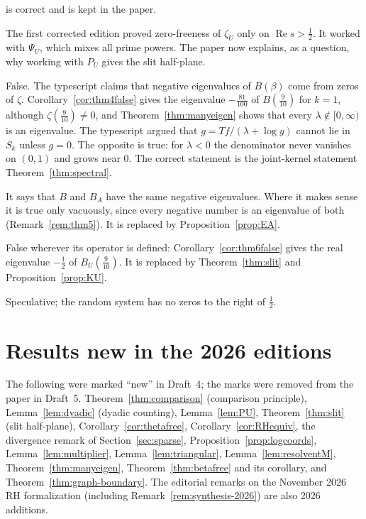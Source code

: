\documentclass[12pt,letterpaper]{article}
\begin{document}
\begin{description}
  is correct and is kept in the paper.
\item[First corrected edition and the slit plane.]  The first corrected
  edition proved zero-freeness of $\zeta_U$ only on $\operatorname{Re} s>\frac12$.  It
  worked with $\Psi_U$, which mixes all prime powers.  The paper now
  explains, as a question, why working with $P_U$ gives the slit
  half-plane.
\item[Theorem 4(a).]  False.  The typescript claims that negative
  eigenvalues of $B(\beta)$ come from zeros of $\zeta$.
  Corollary~\ref{cor:thm4false} gives the eigenvalue $-\frac{81}{100}$ of
  $B(\frac9{10})$ for $k=1$, although $\zeta(\frac9{10})\ne0$, and
  Theorem~\ref{thm:manyeigen} shows that every
  $\lambda\notin[0,\infty)$ is an eigenvalue.  The typescript argued that
  $g=Tf/(\lambda+\log y)$ cannot lie in $S_k$ unless $g=0$.  The opposite
  is true: for $\lambda<0$ the denominator never vanishes on $(0,1)$ and
  grows near $0$.  The correct statement is the joint-kernel statement
  Theorem~\ref{thm:spectral}.
\item[Theorem 5.]  It says that $B$ and $B_A$ have the same negative
  eigenvalues.  Where it makes sense it is true only vacuously, since
  every negative number is an eigenvalue of both (Remark~\ref{rem:thm5}).
  It is replaced by Proposition~\ref{prop:EA}.
\item[Theorem 6.]  False wherever its operator is defined:
  Corollary~\ref{cor:thm6false} gives the real eigenvalue $-\frac12$ of
  $B_U(\frac9{10})$.  It is replaced by Theorem~\ref{thm:slit} and
  Proposition~\ref{prop:KU}.
\item[Closing remarks on pair correlation.]  Speculative; the random
  system has no zeros to the right of $\frac12$.
\end{description}

\section{Results new in the 2026 editions}\label{sec:new}
The following were marked ``new'' in Draft~4; the marks were removed
from the paper in Draft~5.  Theorem~\ref{thm:comparison} (comparison
principle), Lemma~\ref{lem:dyadic} (dyadic counting), Lemma~\ref{lem:PU},
Theorem~\ref{thm:slit} (slit half-plane), Corollary~\ref{cor:thetafree},
Corollary~\ref{cor:RHequiv}, the divergence remark of
Section~\ref{sec:sparse}, Proposition~\ref{prop:logcoords},
Lemma~\ref{lem:multiplier}, Lemma~\ref{lem:triangular},
Lemma~\ref{lem:resolventM}, Theorem~\ref{thm:manyeigen},
Theorem~\ref{thm:betafree} and its corollary, and
Theorem~\ref{thm:graph-boundary}.  The editorial remarks on the November
2026 RH formalization (including Remark~\ref{rem:synthesis-2026}) are
also 2026 additions.
\end{document}
